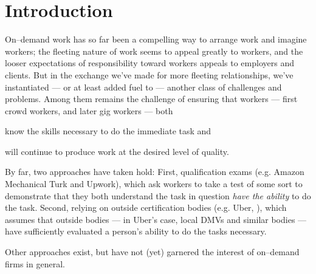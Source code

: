 \documentclass[main]{subfiles}
\begin{document}
\section{Introduction}\label{sec:introduction}

On--demand work has so far been a compelling way to arrange work and imagine workers;
the fleeting nature of work seems to appeal greatly to workers, and
the looser expectations of responsibility toward workers appeals to employers and clients.
But in the exchange we've made for more fleeting relationships,
we've instantiated --- or at least added fuel to ---
another class of challenges and problems.
Among them remains the challenge of ensuring that workers
--- first crowd workers, and later gig workers --- both
\begin{inlinelist}
\item know the skills necessary to do the immediate task and
\item will continue to produce work at the desired level of quality.
\end{inlinelist}
By far, two approaches have taken hold:
First, qualification exams (e.g. Amazon Mechanical Turk and Upwork),
       which ask workers to take a test of some sort to demonstrate that they both
       understand the task in question \textit{have the ability} to do the task.
Second, relying on outside certification bodies (e.g. Uber, ),
        which assumes that outside bodies
        --- in Uber's case, local DMVs and similar bodies ---
        have sufficiently evaluated a person's ability to do the tasks necessary.

Other approaches exist, but have not (yet) garnered the interest of on--demand firms in general.






\end{document}
